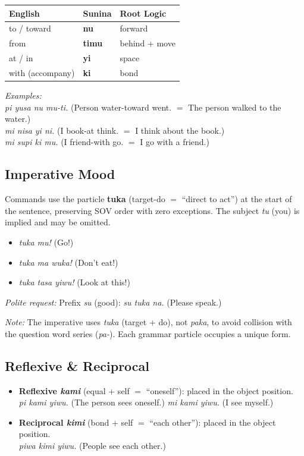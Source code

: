 \documentclass[12pt, a4paper]{article}
\begin{document}
\vspace{0.5em}
\begin{tabular}{@{}lll@{}}
\toprule
\textbf{English} & \textbf{Sunina} & \textbf{Root Logic} \\ \midrule
to / toward & \textbf{nu} & forward \\
from & \textbf{timu} & behind + move \\
at / in & \textbf{yi} & space \\
with (accompany) & \textbf{ki} & bond \\
\bottomrule
\end{tabular}

\vspace{0.5em}
\noindent\textit{Examples:} \\
\textit{pi yusa nu mu-ti.} \quad (Person water-toward went. $=$ The person walked to the water.) \\
\textit{mi nisa yi ni.} \quad (I book-at think. $=$ I think about the book.) \\
\textit{mi supi ki mu.} \quad (I friend-with go. $=$ I go with a friend.)

\subsection{Imperative Mood}
Commands use the particle \textbf{tuka} (target-do $=$ ``direct to act'') at the start of the sentence, preserving SOV order with zero exceptions. The subject \textit{tu} (you) is implied and may be omitted.
\begin{itemize}
    \item \textit{tuka mu!} \quad (Go!)
    \item \textit{tuka ma wuka!} \quad (Don't eat!)
    \item \textit{tuka tasa yiwu!} \quad (Look at this!)
\end{itemize}
\textit{Polite request:} Prefix \textit{su} (good): \quad \textit{su tuka na.} \quad (Please speak.)

\textit{Note:} The imperative uses \textit{tuka} (target + do), not \textit{paka}, to avoid collision with the question word series (\textit{pa-}). Each grammar particle occupies a unique form.

\subsection{Reflexive \& Reciprocal}
\begin{itemize}
    \item \textbf{Reflexive \textit{kami}} (equal + self $=$ ``oneself''): placed in the object position. \\
    \textit{pi kami yiwu.} \quad (The person sees oneself.) \quad \textit{mi kami yiwu.} \quad (I see myself.)
    \item \textbf{Reciprocal \textit{kimi}} (bond + self $=$ ``each other''): placed in the object position. \\
    \textit{piwa kimi yiwu.} \quad (People see each other.)
\end{itemize}
\end{document}
